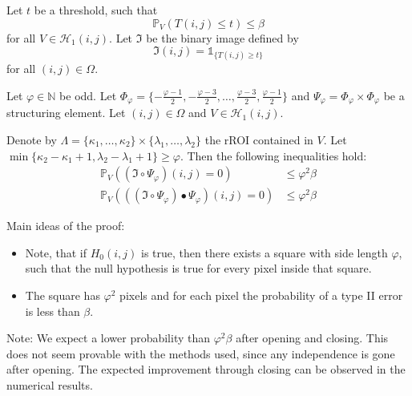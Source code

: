 \documentclass[presentation]{beamer}
\begin{document}
\begin{frame}
	\begin{theorem}
		Let $t$ be a threshold, such that
		\begin{equation*}
			\mathbb{P}_V\left( T(i, j) \leq t \right) \leq \beta
		\end{equation*}
		for all $V \in \mathcal{H}_1(i, j)$. \pause Let $\mathfrak{I}$ be the binary image defined by
		\begin{equation*}
			\mathfrak{I}(i, j) = \mathds{1}_{ \{ T(i, j) \geq t \} }
		\end{equation*}
		for all $(i, j) \in \Omega$. \pause
		
		Let $\varphi \in \mathbb{N}$ be odd. Let $\Phi_\varphi = \{ -\frac{\varphi - 1}{2}, -\frac{\varphi - 3}{2}, \dots, \frac{\varphi - 3}{2}, \frac{\varphi - 1}{2} \}$ and $\Psi_\varphi = \Phi_\varphi \times \Phi_\varphi$ be a structuring element. Let $(i, j) \in \Omega$ and $V \in \mathcal{H}_1(i, j)$. \pause
		
		Denote by $\varLambda = \{ \kappa_1, \dots, \kappa_2 \} \times \{ \lambda_1, \dots, \lambda_2 \}$ the rROI contained in $V$. Let $\min \{ \kappa_2 - \kappa_1 + 1, \lambda_2 - \lambda_1 + 1 \} \geq \varphi$. \pause
		Then the following inequalities hold:
		\begin{align}
			\mathbb{P}_V\left( (\mathfrak{I} \circ \Psi_\varphi)(i, j) = 0 \right) &\leq \varphi^2 \beta \\
			\mathbb{P}_V\left( ((\mathfrak{I} \circ \Psi_\varphi) \bullet \Psi_\varphi)(i, j) = 0 \right) &\leq \varphi^2 \beta
		\end{align}
	\end{theorem}
\end{frame}

\begin{frame}
	Main ideas of the proof:
	\begin{itemize}
		\item Note, that if $H_0(i, j)$ is true, then there exists a square with side length $\varphi$, such that the null hypothesis is true for every pixel inside that square.
		\item The square has $\varphi^2$ pixels and for each pixel the probability of a type II error is less than $\beta$.
	\end{itemize}
	
	Note: We expect a lower probability than $\varphi^2 \beta$ after opening and closing. This does not seem provable with the methods used, since any independence is gone after opening. The expected improvement through closing can be observed in the numerical results.
\end{frame}
\end{document}
